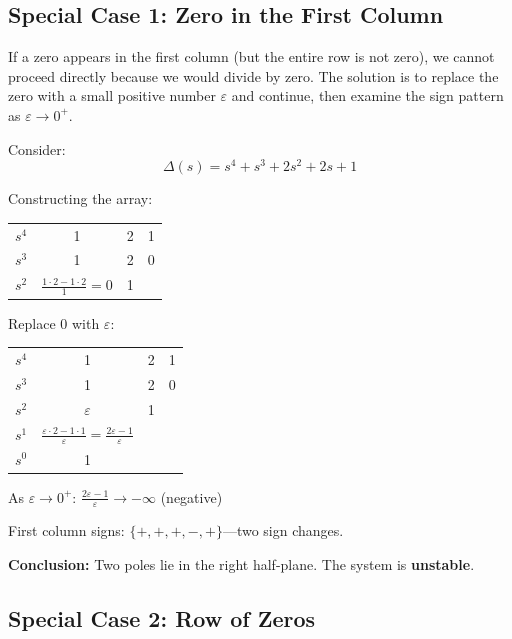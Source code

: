 \subsection{Special Case 1: Zero in the First Column}

If a zero appears in the first column (but the entire row is not zero), we cannot proceed directly because we would divide by zero. The solution is to replace the zero with a small positive number $\varepsilon$ and continue, then examine the sign pattern as $\varepsilon \to 0^+$.

\begin{example}
\label{ex:routh_zero_first_column}
Consider:
\begin{equation}
\Delta(s) = s^4 + s^3 + 2s^2 + 2s + 1
\end{equation}

Constructing the array:
\begin{center}
\begin{tabular}{c|ccc}
$s^4$ & 1 & 2 & 1 \\
$s^3$ & 1 & 2 & 0 \\
$s^2$ & $\frac{1 \cdot 2 - 1 \cdot 2}{1} = 0$ & 1 &
\end{tabular}
\end{center}

Replace 0 with $\varepsilon$:
\begin{center}
\begin{tabular}{c|ccc}
$s^4$ & 1 & 2 & 1 \\
$s^3$ & 1 & 2 & 0 \\
$s^2$ & $\varepsilon$ & 1 & \\
$s^1$ & $\frac{\varepsilon \cdot 2 - 1 \cdot 1}{\varepsilon} = \frac{2\varepsilon - 1}{\varepsilon}$ & & \\
$s^0$ & 1 & &
\end{tabular}
\end{center}

As $\varepsilon \to 0^+$: $\frac{2\varepsilon - 1}{\varepsilon} \to -\infty$ (negative)

First column signs: $\{+, +, +, -, +\}$---two sign changes.

\textbf{Conclusion:} Two poles lie in the right half-plane. The system is \textbf{unstable}.
\end{example}

\subsection{Special Case 2: Row of Zeros}

